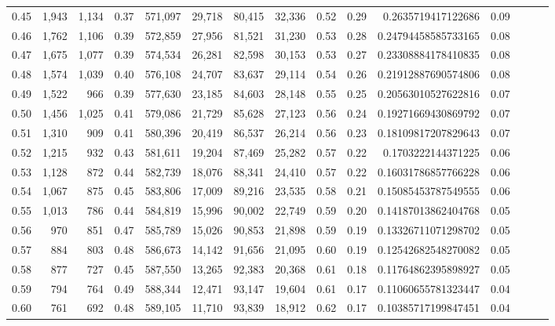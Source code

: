 \begin{tabular}{rrrrrrrrrrrrrrr}
0.45 &   1,943 &  1,134 &  0.37 &  571,097 &   29,718 &   80,415 &   32,336 &  0.52 &  0.29 &     0.2635719417122686 &      0.09 \\
0.46 &   1,762 &  1,106 &  0.39 &  572,859 &   27,956 &   81,521 &   31,230 &  0.53 &  0.28 &    0.24794458585733165 &      0.08 \\
0.47 &   1,675 &  1,077 &  0.39 &  574,534 &   26,281 &   82,598 &   30,153 &  0.53 &  0.27 &    0.23308884178410835 &      0.08 \\
0.48 &   1,574 &  1,039 &  0.40 &  576,108 &   24,707 &   83,637 &   29,114 &  0.54 &  0.26 &    0.21912887690574806 &      0.08 \\
0.49 &   1,522 &    966 &  0.39 &  577,630 &   23,185 &   84,603 &   28,148 &  0.55 &  0.25 &    0.20563010527622816 &      0.07 \\
0.50 &   1,456 &  1,025 &  0.41 &  579,086 &   21,729 &   85,628 &   27,123 &  0.56 &  0.24 &    0.19271669430869792 &      0.07 \\
0.51 &   1,310 &    909 &  0.41 &  580,396 &   20,419 &   86,537 &   26,214 &  0.56 &  0.23 &    0.18109817207829643 &      0.07 \\
0.52 &   1,215 &    932 &  0.43 &  581,611 &   19,204 &   87,469 &   25,282 &  0.57 &  0.22 &     0.1703222144371225 &      0.06 \\
0.53 &   1,128 &    872 &  0.44 &  582,739 &   18,076 &   88,341 &   24,410 &  0.57 &  0.22 &    0.16031786857766228 &      0.06 \\
0.54 &   1,067 &    875 &  0.45 &  583,806 &   17,009 &   89,216 &   23,535 &  0.58 &  0.21 &    0.15085453787549555 &      0.06 \\
0.55 &   1,013 &    786 &  0.44 &  584,819 &   15,996 &   90,002 &   22,749 &  0.59 &  0.20 &    0.14187013862404768 &      0.05 \\
0.56 &     970 &    851 &  0.47 &  585,789 &   15,026 &   90,853 &   21,898 &  0.59 &  0.19 &    0.13326711071298702 &      0.05 \\
0.57 &     884 &    803 &  0.48 &  586,673 &   14,142 &   91,656 &   21,095 &  0.60 &  0.19 &    0.12542682548270082 &      0.05 \\
0.58 &     877 &    727 &  0.45 &  587,550 &   13,265 &   92,383 &   20,368 &  0.61 &  0.18 &    0.11764862395898927 &      0.05 \\
0.59 &     794 &    764 &  0.49 &  588,344 &   12,471 &   93,147 &   19,604 &  0.61 &  0.17 &    0.11060655781323447 &      0.04 \\
0.60 &     761 &    692 &  0.48 &  589,105 &   11,710 &   93,839 &   18,912 &  0.62 &  0.17 &    0.10385717199847451 &      0.04 \\

\end{tabular}
